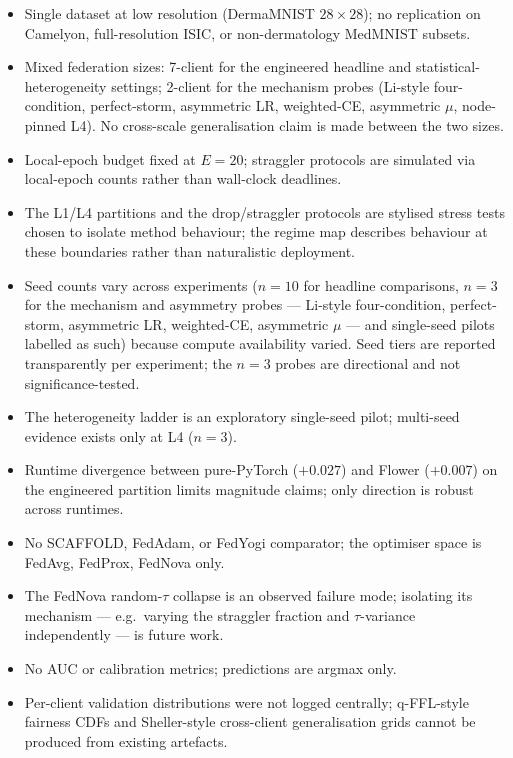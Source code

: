 \documentclass[11pt,a4paper]{report}
\begin{document}
\begin{itemize}
\setlength\itemsep{0.15em}
\item Single dataset at low resolution (DermaMNIST $28 \times 28$); no
replication on Camelyon, full-resolution ISIC, or non-dermatology MedMNIST
subsets.
\item Mixed federation sizes: 7-client for the engineered headline and
statistical-heterogeneity settings; 2-client for the mechanism probes
(Li-style four-condition, perfect-storm, asymmetric LR, weighted-CE,
asymmetric $\mu$, node-pinned L4). No cross-scale generalisation claim is
made between the two sizes.
\item Local-epoch budget fixed at $E = 20$; straggler protocols are
simulated via local-epoch counts rather than wall-clock deadlines.
\item The L1/L4 partitions and the drop/straggler protocols are stylised stress
tests chosen to isolate method behaviour; the regime map describes behaviour at
these boundaries rather than naturalistic deployment.
\item Seed counts vary across experiments ($n = 10$ for headline comparisons,
$n = 3$ for the mechanism and asymmetry probes --- Li-style four-condition,
perfect-storm, asymmetric LR, weighted-CE, asymmetric $\mu$ --- and single-seed
pilots labelled as such) because compute availability varied. Seed tiers are
reported transparently per experiment; the $n = 3$ probes are directional and not
significance-tested.
\item The heterogeneity ladder is an exploratory single-seed pilot; multi-seed
evidence exists only at L4 ($n = 3$).
\item Runtime divergence between pure-PyTorch ($+0.027$) and Flower
($+0.007$) on the engineered partition limits magnitude claims; only
direction is robust across runtimes.
\item No SCAFFOLD, FedAdam, or FedYogi comparator; the optimiser space is
FedAvg, FedProx, FedNova only.
\item The FedNova random-$\tau$ collapse is an observed failure mode; isolating
its mechanism --- e.g.\ varying the straggler fraction and $\tau$-variance
independently --- is future work.
\item No AUC or calibration metrics; predictions are argmax only.
\item Per-client validation distributions were not logged centrally;
q-FFL-style fairness CDFs and Sheller-style cross-client generalisation
grids cannot be produced from existing artefacts.
\end{itemize}
\end{document}
